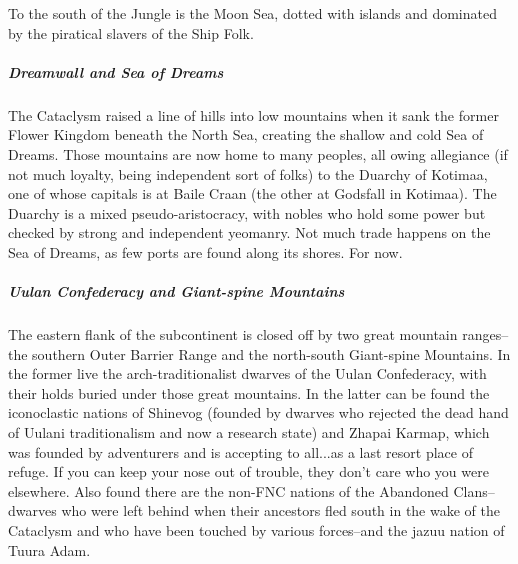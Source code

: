 To the south of the Jungle is the Moon Sea, dotted with islands and dominated by the piratical slavers of the Ship Folk.

\subparagraph*{Dreamwall and Sea of Dreams} The Cataclysm raised a line of hills into low mountains when it sank the former Flower Kingdom beneath the North Sea, creating the shallow and cold Sea of Dreams. Those mountains are now home to many peoples, all owing allegiance (if not much loyalty, being independent sort of folks) to the Duarchy of Kotimaa, one of whose capitals is at Baile Craan (the other at Godsfall in Kotimaa). The Duarchy is a mixed pseudo-aristocracy, with nobles who hold some power but checked by strong and independent yeomanry. Not much trade happens on the Sea of Dreams, as few ports are found along its shores. For now.

\subparagraph*{Uulan Confederacy and Giant-spine Mountains}
The eastern flank of the subcontinent is closed off by two great mountain ranges--the southern Outer Barrier Range and the north-south Giant-spine Mountains. In the former live the arch-traditionalist dwarves of the Uulan Confederacy, with their holds buried under those great mountains. In the latter can be found the iconoclastic nations of Shinevog (founded by dwarves who rejected the dead hand of Uulani traditionalism and now a research state) and Zhapai Karmap, which was founded by adventurers and is accepting to all...as a last resort place of refuge. If you can keep your nose out of trouble, they don't care who you were elsewhere. Also found there are the non-FNC nations of the Abandoned Clans--dwarves who were left behind when their ancestors fled south in the wake of the Cataclysm and who have been touched by various forces--and the jazuu nation of Tuura Adam.